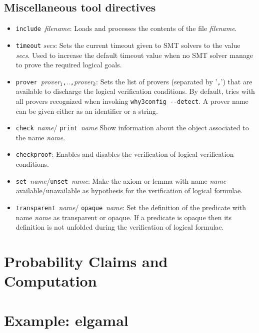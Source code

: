 \section{Miscellaneous tool directives}
\begin{itemize}
\item {\verb+include+~\textit{filename}}: Loads and processes the
  contents of the \EasyCrypt file \textit{filename}.

\item {\verb+timeout+ \textit{secs}:} Sets the current timeout given
  to SMT solvers to the value \textit{secs}. Used to increase the
  default timeout value when no SMT solver manage to prove the
  required logical goals.

\item %
  {\verb+prover+~\textit{prover${}_1$}\verb+,+..\verb+,+\textit{prover${}_k$}:}
  Sets the list of provers (separated by '\verb+,+') that are
  available to discharge the logical verification conditions. By
  default, \EasyCrypt tries with all provers recognized when invoking
  \verb|why3config --detect|. A prover name can be given either as an
  identifier or a string.

\item {\verb+check+~\textit{name}/ \verb+print+~\textit{name}} Show
  information about the object associated to the name \textit{name}. 
  

\item {\verb+checkproof+:} Enables and disables the verification of
  logical verification conditions. 

\item {\verb+set+~\textit{name}/\verb+unset+~\textit{name}}: Make the
  axiom or lemma with name \textit{name} available/unavailable as
  hypothesis for the verification of logical formulae.

\item {\verb+transparent+~\textit{name}/ \verb+opaque+~\textit{name}}:
  Set the definition of the predicate with name \textit{name} as
  transparent or opaque. If a predicate is opaque then its definition
  is not unfolded during the verification of logical formulae.


\end{itemize}

\chapter{Probability Claims and Computation}


\chapter{Example: elgamal}



